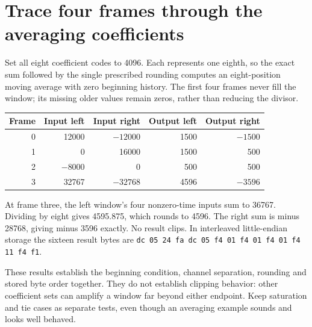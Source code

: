 \section{Trace four frames through the averaging coefficients}
Set all eight coefficient codes to 4096. Each represents one eighth, so the exact
sum followed by the single prescribed rounding computes an eight-position moving
average with zero beginning history. The first four frames never fill the window;
its missing older values remain zeros, rather than reducing the divisor.

\begin{center}
  \begin{tabular}{rrrrr}
    Frame & Input left & Input right & Output left & Output right \\
    \hline
    0     & 12000      & $-12000$    & 1500        & $-1500$      \\
    1     & 0          & 16000       & 1500        & 500          \\
    2     & $-8000$    & 0           & 500         & 500          \\
    3     & 32767      & $-32768$    & 4596        & $-3596$      \\
  \end{tabular}
\end{center}

At frame three, the left window's four nonzero-time inputs sum to 36767. Dividing
by eight gives 4595.875, which rounds to 4596. The right sum is minus 28768, giving
minus 3596 exactly. No result clips. In interleaved little-endian storage the sixteen
result bytes are \texttt{dc 05 24 fa dc 05 f4 01 f4 01 f4 01 f4 11 f4 f1}.

These results establish the beginning condition, channel separation, rounding and
stored byte order together. They do not establish clipping behavior: other coefficient
sets can amplify a window far beyond either endpoint. Keep saturation and tie cases
as separate tests, even though an averaging example sounds and looks well behaved.
